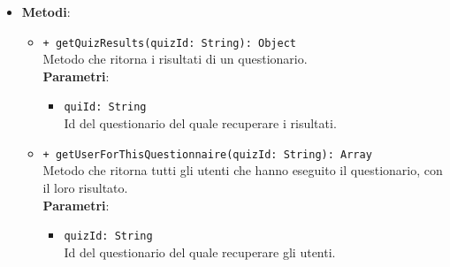 \begin{itemize}
\begin{itemize}
		\end{itemize}
		\item \textbf{Metodi}: 
		\begin{itemize}
			\item \texttt{+ getQuizResults(quizId: String): Object} \\ Metodo che ritorna i risultati di un questionario.\\
			\textbf{Parametri}:
			\begin{itemize}
				\item \texttt{quiId: String} \\ 
				Id del questionario del quale recuperare i risultati.
			\end{itemize}
			\item \texttt{+ getUserForThisQuestionnaire(quizId: String): Array} \\ Metodo che ritorna tutti gli utenti che hanno eseguito il questionario, con il loro risultato.\\
			\textbf{Parametri}:
			\begin{itemize}
				\item \texttt{quizId: String} \\ Id del questionario del quale recuperare gli utenti.
			\end{itemize}
				
		\end{itemize}
	\end{itemize}

	